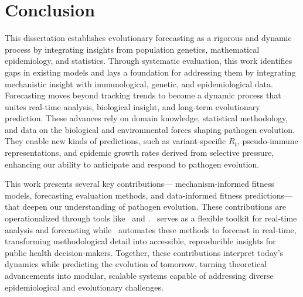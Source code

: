 \chapter{Conclusion}





This dissertation establishes evolutionary forecasting as a rigorous and dynamic process by integrating insights from population genetics, mathematical epidemiology, and statistics. 
Through systematic evaluation, this work identifies gaps in existing models and lays a foundation for addressing them by integrating mechanistic insight with immunological, genetic, and epidemiological data.
Forecasting moves beyond tracking trends to become a dynamic process that unites real-time analysis, biological insight, and long-term evolutionary prediction. These advances rely on domain knowledge, statistical methodology, and data on the biological and environmental forces shaping pathogen evolution. They enable new kinds of predictions, such as variant-specific $R_t$, pseudo-immune representations, and epidemic growth rates derived from selective pressure, enhancing our ability to anticipate and respond to pathogen evolution.

This work presents several key contributions— mechanism-informed fitness models, forecasting evaluation methods, and data-informed fitness predictions— that deepen our understanding of pathogen evolution.
These contributions are operationalized through tools like \evofr\ and \forecastsNcov.
\evofr\ serves as a flexible toolkit for real-time analysis and forecasting while \forecastsNcov\ automates these methods to forecast in real-time, transforming methodological detail into accessible, reproducible insights for public health decision-makers.
Together, these contributions interpret today’s dynamics while predicting the evolution of tomorrow, turning theoretical advancements into modular, scalable systems capable of addressing diverse epidemiological and evolutionary challenges.


